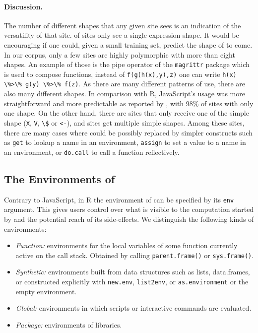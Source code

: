 \documentclass[review,screen,acmsmall]{acmart}%
\renewcommand{\k}[1]{\lstinline |#1|\xspace}
\begin{document}
\paragraph{Discussion.} The number of different shapes that any given
\eval site sees is an indication of the versatility of that site.
\packageNbOneMinimizedPercent of sites only see a single expression shape. It
would be encouraging if one could, given a small training set, predict the shape
of \evals to come. In our corpus, only a few sites are highly polymorphic with
more than eight shapes. An example of those is the pipe operator of the
\k{magrittr} package which is used to compose functions, \eg instead of
\k{f(g(h(x),y),z)} one can write \k{h(x) \%>\% g(y) \%>\% f(z)}. As there are many
different patterns of use, there are also many different shapes. In comparison
with R, JavaScript's \eval usage was more straightforward and more predictable
as reported by \citet{oopsla12b}, with 98\% of sites with only one shape. On the
other hand, there are \packageNbSimpleMinimizedOne sites that only receive one
of the simple shape (\ie\xspace \k{X}, \k{V}, \k{\$} or \k{<-}), and
\packageNbSimpleMinimizedMore sites get multiple simple shapes. Among these
sites, there are many cases where \eval could be possibly replaced by simpler constructs
such as \k{get} to lookup a name in an environment, \k{assign} to set a value to
a name in an environment, or \k{do.call} to call a function reflectively.

\subsection{The Environments of \Eval}\label{sec:env}

Contrary to JavaScript, in R the environment of \eval can be specified by its
\k{env} argument. This gives users control over what is visible to the
computation started by \eval and the potential reach of its side-effects. We
distinguish the following kinds of environments:

\begin{itemize}[---]
\item \emph{Function:} environments for the local variables of some function
  currently active on the call stack. Obtained by calling \k{parent.frame()} or
  \k{sys.frame()}.
\item \emph{Synthetic:} environments built from data structures such as lists,
  data.frames, or constructed explicitly with \k{new.env}, \k{list2env}, or
  \k{as.environment} or the empty environment.
\item \emph{Global:} environments in which scripts or interactive commands are
  evaluated.
\item \emph{Package:} environments of libraries.
\end{itemize}
\end{document}
